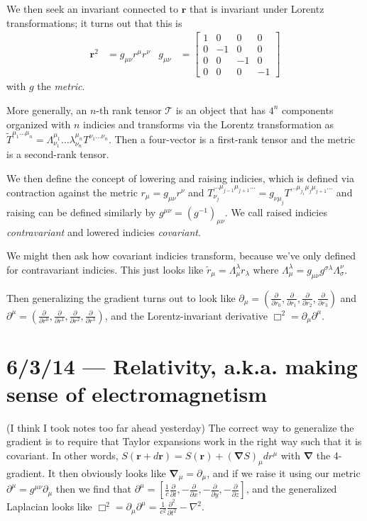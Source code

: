 \documentclass[10pt]{report}
\newcommand{\pd}[2]{\frac{\partial #1}{\partial#2}}
\newcommand{\ptd}[2]{\frac{\partial^2 #1}{\partial#2^2}}
\begin{document}
We then seek an invariant connected to $\mathbf{r}$ that is invariant under Lorentz transformations; it turns out that this is 
\begin{align}
    \mathbf{r}^2 &= g_{\mu \nu}r^\mu r^\nu & g_{\mu \nu} &= \begin{bmatrix} 1 & 0 & 0 & 0\\0 & -1 & 0 & 0\\0 & 0 & -1 & 0\\0 & 0 & 0 & -1 \end{bmatrix} \end{align}
with $g$ the \emph{metric}.

More generally, an $n$-th rank tensor $\mathcal{T}$ is an object that has $4^n$ components organized with $n$ indicies and transforms via the Lorentz transformation as $\tilde{T}^{\mu_1\dots\mu_n} = \Lambda^{\mu_1}_{\nu_1} \dots \lambda^{\mu_n}_{\nu_n} T^{\nu_1\dots \nu_n}$. Then a four-vector is a first-rank tensor and the metric is a second-rank tensor. 

We then define the concept of lowering and raising indicies, which is defined via contraction against the metric $r_\mu = g_{\mu\nu}r^{\nu}$ and $T^{\dots\mu_{j-1}\mu_{j+1}\dots}_{\nu_j} = g_{\nu \mu_j}T^{\dots\mu_{j_1}\mu_j\mu_{j+1}\dots}$ and raising can be defined similarly by $g^{\mu \nu} = \left( g^{-1} \right)_{\mu \nu}$. We call raised indicies \emph{contravariant} and lowered indicies \emph{covariant}.

We might then ask how covariant indicies transform, because we've only defined for contravariant indicies. This just looks like $\tilde{r}_\mu = \Lambda_\mu^\lambda r_\lambda$ where $\Lambda_\mu^\lambda = g_{\mu\nu}g^{\sigma\lambda}\Lambda_\sigma^\nu$. 

Then generalizing the gradient turns out to look like $\partial_\mu = \left( \pd{}{r_0}, \pd{}{r_1}, \pd{}{r_2}, \pd{}{r_3} \right)$ and $\partial^\mu = \left( \pd{}{r^0}, \pd{}{r^1}, \pd{}{r^2}, \pd{}{r^3}\right)$, and the Lorentz-invariant derivative $\Box^2 = \partial_\mu \partial^\mu$. 

\chapter{6/3/14 --- Relativity, a.k.a. making sense of electromagnetism}

(I think I took notes too far ahead yesterday) The correct way to generalize the gradient is to require that Taylor expansions work in the right way such that it is covariant. In other words, $S(\mathbf{r} + d\mathbf{r}) = S(\mathbf{r}) + (\mathbf{\nabla}S)_\mu dr^\mu$ with $\mathbf{\nabla}$ the 4-gradient. It then obviously looks like $\mathbf{\nabla}_\mu = \partial_\mu$, and if we raise it using our metric $\partial^\mu = g^{\mu \nu}\partial_\mu$ then we find that $\partial^\mu = \left[ \frac{1}{c}\pd{}{t}, -\pd{}{x}, -\pd{}{y}, -\pd{}{z} \right]$, and the generalized Laplacian looks like $\Box^2 = \partial_\mu \partial^\mu = \frac{1}{c^2}\ptd{}{t} - \nabla^2$.
\end{document}
